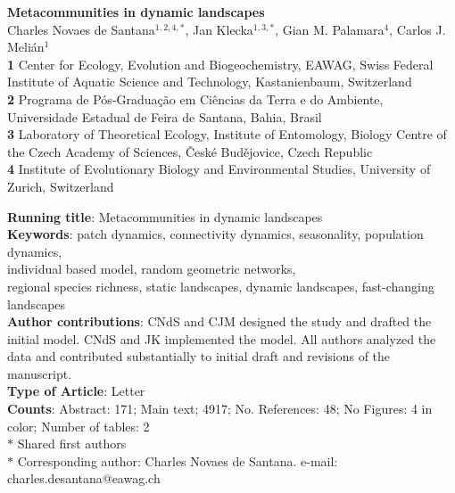 \documentclass[12pt]{article}
\date{}
\begin{document}
\begin{flushleft}
{\Large
\textbf{Metacommunities in dynamic landscapes}}
\\
\vspace{1.0cm} Charles Novaes de Santana$^{1,2,4,\ast}$, Jan
Klecka$^{1,3,\ast}$, Gian M. Palamara$^{4}$, Carlos J. Meli\'an$^{1}$
\\
\vspace{1.0cm} \textbf{1} Center for Ecology, Evolution and Biogeochemistry, EAWAG,
Swiss Federal Institute of Aquatic Science and Technology, Kastanienbaum, Switzerland
\\
\textbf{2} Programa de P\'{o}s-Graduaç\~{a}o em Ci\^{e}ncias da Terra e do Ambiente,
Universidade Estadual de Feira de Santana, Bahia, Brasil
\\
\textbf{3} Laboratory of Theoretical Ecology, Institute of Entomology,
Biology Centre of the Czech Academy of Sciences, \v{C}esk\'{e}
Bud\v{e}jovice, Czech Republic\\
\textbf{4} Institute of Evolutionary Biology and Environmental Studies, University of Zurich, Switzerland\\
  \vspace{0.5 in}
  
  \textbf{Running title}: Metacommunities in dynamic landscapes\\

  \textbf{Keywords}: patch dynamics, connectivity dynamics, seasonality, population dynamics, \\ individual based model, random geometric networks,\\
  regional species richness, static landscapes, dynamic landscapes, fast-changing landscapes\\

  \textbf{Author contributions}: CNdS and CJM designed the study and drafted the initial model. CNdS and JK implemented the model. All authors analyzed the data and contributed substantially to initial draft and revisions of the manuscript.  
  \\
  \textbf{Type of Article}: Letter\\

  \textbf{Counts}: Abstract: 171; Main text; 4917; No. References: 48; No Figures: 4 in color; Number of tables: 2\\
$\ast$ Shared first authors\\
$\ast$ Corresponding author: Charles Novaes de Santana. e-mail: charles.desantana@eawag.ch\\
\end{flushleft}
\end{document}
